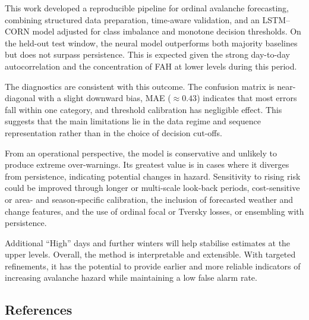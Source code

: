 \documentclass[
  letterpaper,
  DIV=11,
  numbers=noendperiod]{scrartcl}
\begin{document}
This work developed a reproducible pipeline for ordinal avalanche
forecasting, combining structured data preparation, time-aware
validation, and an LSTM--CORN model adjusted for class imbalance and
monotone decision thresholds. On the held-out test window, the neural
model outperforms both majority baselines but does not surpass
persistence. This is expected given the strong day-to-day
autocorrelation and the concentration of FAH at lower levels during this
period.

The diagnostics are consistent with this outcome. The confusion matrix
is near-diagonal with a slight downward bias, MAE (\(\approx 0.43\))
indicates that most errors fall within one category, and threshold
calibration has negligible effect. This suggests that the main
limitations lie in the data regime and sequence representation rather
than in the choice of decision cut-offs.

From an operational perspective, the model is conservative and unlikely
to produce extreme over-warnings. Its greatest value is in cases where
it diverges from persistence, indicating potential changes in hazard.
Sensitivity to rising risk could be improved through longer or
multi-scale look-back periods, cost-sensitive or area- and
season-specific calibration, the inclusion of forecasted weather and
change features, and the use of ordinal focal or Tversky losses, or
ensembling with persistence.

Additional ``High'' days and further winters will help stabilise
estimates at the upper levels. Overall, the method is interpretable and
extensible. With targeted refinements, it has the potential to provide
earlier and more reliable indicators of increasing avalanche hazard
while maintaining a low false alarm rate.

\subsection{References}\label{references}
\end{document}
